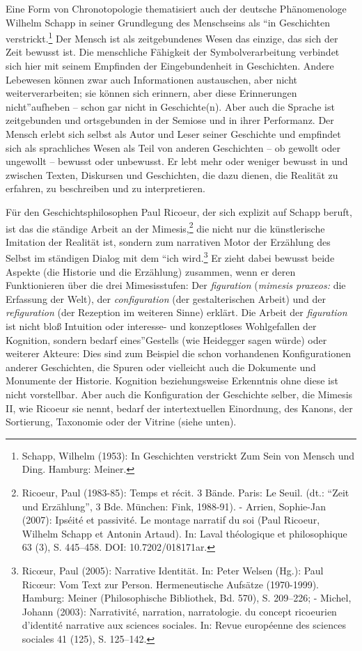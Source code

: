Eine Form von Chronotopologie thematisiert auch der deutsche
Phänomenologe Wilhelm Schapp in seiner Grundlegung des Menschseins als
\enquote{in Geschichten verstrickt.\footnote{Schapp, Wilhelm (1953): In
  Geschichten verstrickt Zum Sein von Mensch und Ding. Hamburg: Meiner.}
Der Mensch ist als zeitgebundenes Wesen das einzige, das sich der Zeit
bewusst ist. Die menschliche Fähigkeit der Symbolverarbeitung verbindet
sich hier mit seinem Empfinden der Eingebundenheit in Geschichten.
Andere Lebewesen können zwar auch Informationen austauschen, aber nicht
weiterverarbeiten; sie können sich erinnern, aber diese Erinnerungen
nicht}aufheben -- schon gar nicht in Geschichte(n). Aber auch die
Sprache ist zeitgebunden und ortsgebunden in der Semiose und in ihrer
Performanz. Der Mensch erlebt sich selbst als Autor und Leser seiner
Geschichte und empfindet sich als sprachliches Wesen als Teil von
anderen Geschichten -- ob gewollt oder ungewollt -- bewusst oder
unbewusst. Er lebt mehr oder weniger bewusst in und zwischen Texten,
Diskursen und Geschichten, die dazu dienen, die Realität zu erfahren, zu
beschreiben und zu interpretieren.

Für den Geschichtsphilosophen Paul Ricoeur, der sich explizit auf Schapp
beruft, ist das die ständige Arbeit an der Mimesis,\footnote{Ricoeur,
  Paul (1983-85): Temps et récit. 3 Bände. Paris: Le Seuil. (dt.: \enquote{Zeit
  und Erzählung}, 3 Bde. München: Fink, 1988-91). - Arrien, Sophie-Jan
  (2007): Ipséité et passivité. Le montage narratif du soi (Paul
  Ricoeur, Wilhelm Schapp et Antonin Artaud). In: Laval théologique et
  philosophique 63 (3), S. 445--458. DOI: 10.7202/018171ar.} die nicht
nur die künstlerische Imitation der Realität ist, sondern zum narrativen
Motor der Erzählung des Selbst im ständigen Dialog mit dem \enquote{ich
wird.\footnote{Ricœur, Paul (2005): Narrative Identität. In: Peter
  Welsen (Hg.): Paul Ricœur: Vom Text zur Person. Hermeneutische
  Aufsätze (1970-1999). Hamburg: Meiner (Philosophische Bibliothek, Bd.
  570), S. 209--226; - Michel, Johann (2003): Narrativité, narration,
  narratologie. du concept ricoeurien d'identité narrative aux sciences
  sociales. In: Revue européenne des sciences sociales 41 (125), S.
  125--142.} Er zieht dabei bewusst beide Aspekte (die Historie und die
Erzählung) zusammen, wenn er deren Funktionieren über die drei
Mimesisstufen: Der \emph{figuration} (\emph{mimesis praxeos:} die
Erfassung der Welt), der \emph{configuration} (der gestalterischen
Arbeit) und der \emph{refiguration} (der Rezeption im weiteren Sinne)
erklärt. Die Arbeit der \emph{figuration} ist nicht bloß Intuition oder
interesse- und konzeptloses Wohlgefallen der Kognition, sondern bedarf
eines}Gestells (wie Heidegger sagen würde) oder weiterer Akteure: Dies
sind zum Beispiel die schon vorhandenen Konfigurationen anderer
Geschichten, die Spuren oder vielleicht auch die Dokumente und Monumente
der Historie. Kognition beziehungsweise Erkenntnis ohne diese ist nicht
vorstellbar. Aber auch die Konfiguration der Geschichte selber, die
Mimesis II, wie Ricoeur sie nennt, bedarf der intertextuellen
Einordnung, des Kanons, der Sortierung, Taxonomie oder der Vitrine
(siehe unten).

